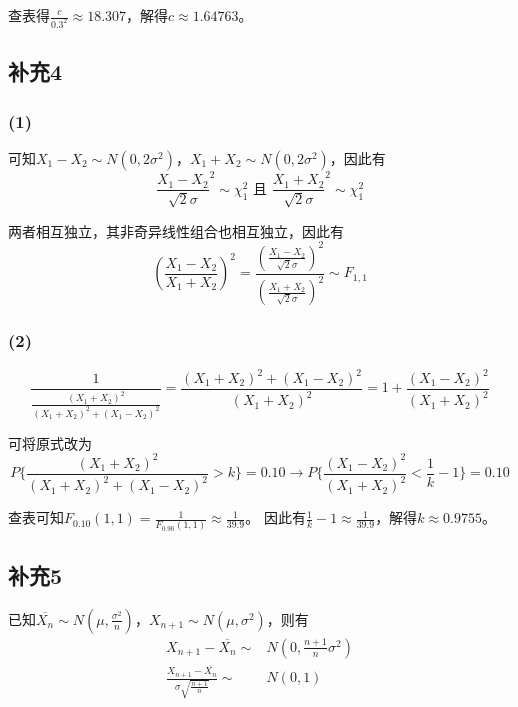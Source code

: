 \documentclass[a4paper,12pt]{ctexart}
\begin{document}
查表得$\frac{c}{0.3^2} \approx 18.307$，解得$c \approx 1.64763$。

\subsection*{补充4}

\subsubsection*{(1)}

可知$X_1 - X_2 \sim N(0, 2\sigma^2)$，$X_1 + X_2 \sim N(0, 2\sigma^2)$，因此有
\begin{equation*}
	\frac{X_1 - X_2}{\sqrt{2}\sigma}^2 \sim \chi^2_1 \text{ 且 } \frac{X_1 + X_2}{\sqrt{2}\sigma}^2 \sim \chi^2_1
\end{equation*}

两者相互独立，其非奇异线性组合也相互独立，因此有
\begin{equation*}
	\left(\frac{X_1 - X_2}{X_1 + X_2}\right)^2 = \frac{(\frac{X_1 - X_2}{\sqrt{2}\sigma})^2}{(\frac{X_1 + X_2}{\sqrt{2}\sigma})^2} \sim F_{1, 1}
\end{equation*}

\subsubsection*{(2)}

\begin{equation*}
	\frac{1}{\frac{(X_1+X_2)^2}{(X_1+X_2)^2+(X_1-X_2)^2}} = \frac{(X_1+X_2)^2+(X_1-X_2)^2}{(X_1+X_2)^2} = 1 + \frac{(X_1-X_2)^2}{(X_1+X_2)^2}
\end{equation*}

可将原式改为
\begin{equation*}
	P\{\frac{(X_1+X_2)^2}{(X_1+X_2)^2+(X_1-X_2)^2} > k\} = 0.10 \rightarrow P\{\frac{(X_1-X_2)^2}{(X_1+X_2)^2} < \frac{1}{k} - 1\} = 0.10
\end{equation*}

查表可知$F_{0.10}(1,1) = \frac{1}{F_{0.90}(1,1)} \approx \frac{1}{39.9}$。
因此有$\frac{1}{k} - 1 \approx \frac{1}{39.9}$，解得$k \approx 0.9755$。

\subsection*{补充5}

已知$\overline{X_n} \sim N(\mu, \frac{\sigma^2}{n})$，$X_{n+1} \sim N(\mu, \sigma^2)$，则有
\begin{align*}
	X_{n+1} - \overline{X_n} \sim& N(0, \frac{n+1}{n}\sigma^2) \\
	\frac{X_{n+1} - \overline{X_n}}{\sigma\sqrt{\frac{n+1}{n}}} \sim& N(0, 1)
\end{align*}
\end{document}
